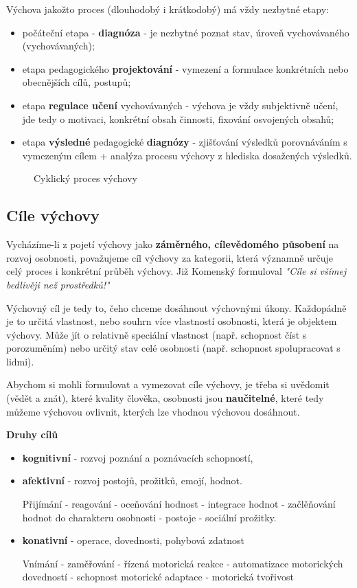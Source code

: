 \documentclass[a4paper,12pt]{report}
\begin{document}
Výchova jakožto proces (dlouhodobý i krátkodobý) má vždy nezbytné etapy:
\begin{itemize}
 \item počáteční etapa - \textbf{diagnóza} - je nezbytné poznat stav, úroveň vychovávaného (vychovávaných);
 \item etapa pedagogického \textbf{projektování} - vymezení a formulace konkrétních nebo obecnějších cílů, postupů;
 \item etapa \textbf{regulace učení} vychovávaných - výchova je vždy subjektivně učení, jde tedy o motivaci, konkrétní obsah činnosti, fixování osvojených obsahů;
 \item etapa \textbf{výsledné} pedagogické \textbf{diagnózy} - zjišťování výsledků porovnáváním s vymezeným cílem + analýza procesu výchovy z hlediska dosažených výsledků.
\end{itemize}

\begin{figure}[ht!]
\centering
{}
\caption{Cyklický proces výchovy}
\end{figure}\pagelogos

\subsection*{Cíle výchovy}
\pagelogos
Vycházíme-li z pojetí výchovy jako \textbf{záměrného, cílevědomého působení} na rozvoj osobnosti, považujeme cíl výchovy za kategorii, která významně určuje celý proces i konkrétní průběh výchovy. Již Komenský formuloval \textit{"Cíle si všímej bedlivěji než prostředků!"}

Výchovný cíl je tedy to, čeho chceme dosáhnout výchovnými úkony. Každopádně je to určitá vlastnost, nebo souhrn více vlastností osobnosti, která je objektem výchovy. Může jít o relativně speciální vlastnost (např. schopnost číst s porozuměním) nebo určitý stav celé osobnosti (např. schopnost spolupracovat s lidmi).

Abychom si mohli formulovat a vymezovat cíle výchovy, je třeba si uvědomit (vědět a znát), které kvality člověka, osobnosti jsou \textbf{naučitelné}, které tedy můžeme výchovou ovlivnit, kterých lze vhodnou výchovou dosáhnout.

\textbf{Druhy cílů}
\begin{itemize}
 \item \textbf{kognitivní} - rozvoj poznání a poznávacích schopností,
 \item \textbf{afektivní} - rozvoj postojů, prožitků, emojí, hodnot.
 
 Přijímání - reagování - oceňování hodnost - integrace hodnot - začlěňování hodnot do charakteru osobnosti - postoje - sociální prožitky.
 \item \textbf{konativní} - operace, dovednosti, pohybová zdatnost
 
 Vnímání - zaměřování - řízená motorická reakce - automatizace motorických dovedností - schopnost motorické adaptace - motorická tvořivost
\end{itemize}
\end{document}
